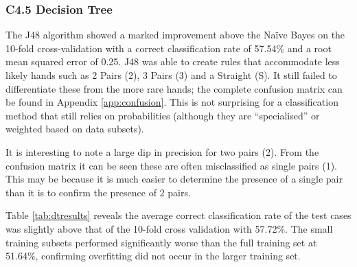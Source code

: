 \documentclass[10pt, a4paper]{article}
\begin{document}
\subsubsection*{C4.5 Decision Tree}

The J48 algorithm showed a marked improvement above the Na\"ive Bayes on the 10-fold cross-validation with a correct classification rate of 57.54\% and a root mean squared error of 0.25. J48 was able to create rules that accommodate less likely hands such as 2 Pairs (2), 3 Pairs (3) and a Straight (S). It still failed to differentiate these from the more rare hands; the complete confusion matrix can be found in Appendix \ref{app:confusion}. This is not surprising for a classification method that still relies on probabilities (although they are ``specialised'' or weighted based on data subsets). 

It is interesting to note a large dip in precision for two pairs (2). From the confusion matrix it can be seen these are often misclassified as single pairs (1). This may be because it is much easier to determine the presence of a single pair than it is to confirm the presence of 2 pairs.

Table \ref{tab:dtresults} reveals the average correct classification rate of the test cases was slightly above that of the 10-fold cross validation with 57.72\%. The small training subsets performed significantly worse than the full training set at 51.64\%, confirming overfitting did not occur in the larger training set.
\end{document}
